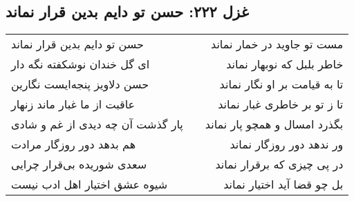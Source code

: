 \begin{center}
\section*{غزل ۲۲۲: حسن تو دایم بدین قرار نماند}
\label{sec:222}
\begin{longtable}{l p{0.5cm} r}
حسن تو دایم بدین قرار نماند
&&
مست تو جاوید در خمار نماند
\\
ای گل خندان نوشکفته نگه دار
&&
خاطر بلبل که نوبهار نماند
\\
حسن دلاویز پنجه‌ایست نگارین
&&
تا به قیامت بر او نگار نماند
\\
عاقبت از ما غبار ماند زنهار
&&
تا ز تو بر خاطری غبار نماند
\\
پار گذشت آن چه دیدی از غم و شادی
&&
بگذرد امسال و همچو پار نماند
\\
هم بدهد دور روزگار مرادت
&&
ور ندهد دور روزگار نماند
\\
سعدی شوریده بی‌قرار چرایی
&&
در پی چیزی که برقرار نماند
\\
شیوه عشق اختیار اهل ادب نیست
&&
بل چو قضا آید اختیار نماند
\\
\end{longtable}
\end{center}
